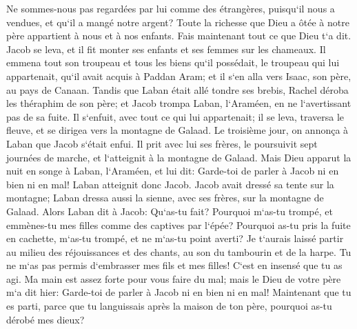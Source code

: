 \verse Ne sommes-nous pas regardées par lui comme des étrangères, puisqu`il nous a vendues, et qu`il a mangé notre argent? 
\verse Toute la richesse que Dieu a ôtée à notre père appartient à nous et à nos enfants. Fais maintenant tout ce que Dieu t`a dit. 
\verse Jacob se leva, et il fit monter ses enfants et ses femmes sur les chameaux. 
\verse Il emmena tout son troupeau et tous les biens qu`il possédait, le troupeau qui lui appartenait, qu`il avait acquis à Paddan Aram; et il s`en alla vers Isaac, son père, au pays de Canaan. 
\verse Tandis que Laban était allé tondre ses brebis, Rachel déroba les théraphim de son père; 
\verse et Jacob trompa Laban, l`Araméen, en ne l`avertissant pas de sa fuite. 
\verse Il s`enfuit, avec tout ce qui lui appartenait; il se leva, traversa le fleuve, et se dirigea vers la montagne de Galaad. 
\verse Le troisième jour, on annonça à Laban que Jacob s`était enfui. 
\verse Il prit avec lui ses frères, le poursuivit sept journées de marche, et l`atteignit à la montagne de Galaad. 
\verse Mais Dieu apparut la nuit en songe à Laban, l`Araméen, et lui dit: Garde-toi de parler à Jacob ni en bien ni en mal! 
\verse Laban atteignit donc Jacob. Jacob avait dressé sa tente sur la montagne; Laban dressa aussi la sienne, avec ses frères, sur la montagne de Galaad. 
\verse Alors Laban dit à Jacob: Qu`as-tu fait? Pourquoi m`as-tu trompé, et emmènes-tu mes filles comme des captives par l`épée? 
\verse Pourquoi as-tu pris la fuite en cachette, m`as-tu trompé, et ne m`as-tu point averti? Je t`aurais laissé partir au milieu des réjouissances et des chants, au son du tambourin et de la harpe. 
\verse Tu ne m`as pas permis d`embrasser mes fils et mes filles! C`est en insensé que tu as agi. 
\verse Ma main est assez forte pour vous faire du mal; mais le Dieu de votre père m`a dit hier: Garde-toi de parler à Jacob ni en bien ni en mal! 
\verse Maintenant que tu es parti, parce que tu languissais après la maison de ton père, pourquoi as-tu dérobé mes dieux? 
